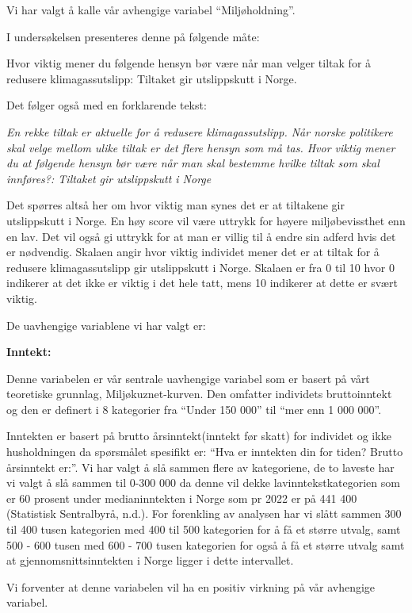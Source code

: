 \documentclass[
  12pt,
  letterpaper,
  DIV=11,
  numbers=noendperiod]{scrartcl}
\begin{document}
Vi har valgt å kalle vår avhengige variabel ``Miljøholdning''.

I undersøkelsen presenteres denne på følgende måte:

Hvor viktig mener du følgende hensyn bør være når man velger tiltak for
å redusere klimagassutslipp: Tiltaket gir utslippskutt i Norge.

Det følger også med en forklarende tekst:

\emph{En rekke tiltak er aktuelle for å redusere klimagassutslipp. Når
norske politikere skal velge mellom ulike tiltak er det flere hensyn som
må tas. Hvor viktig mener du at følgende hensyn bør være når man skal
bestemme hvilke tiltak som skal innføres?: Tiltaket gir utslippskutt i
Norge}

Det spørres altså her om hvor viktig man synes det er at tiltakene gir
utslippskutt i Norge. En høy score vil være uttrykk for høyere
miljøbevissthet enn en lav. Det vil også gi uttrykk for at man er villig
til å endre sin adferd hvis det er nødvendig. Skalaen angir hvor viktig
individet mener det er at tiltak for å redusere klimagassutslipp gir
utslippskutt i Norge. Skalaen er fra 0 til 10 hvor 0 indikerer at det
ikke er viktig i det hele tatt, mens 10 indikerer at dette er svært
viktig.

De uavhengige variablene vi har valgt er:

\textbf{Inntekt:}

Denne variabelen er vår sentrale uavhengige variabel som er basert på
vårt teoretiske grunnlag, Miljøkuznet-kurven. Den omfatter individets
bruttoinntekt og den er definert i 8 kategorier fra ``Under 150 000''
til ``mer enn 1 000 000''.

Inntekten er basert på brutto årsinntekt(inntekt før skatt) for
individet og ikke husholdningen da spørsmålet spesifikt er: ``Hva er
inntekten din for tiden? Brutto årsinntekt er:''. Vi har valgt å slå
sammen flere av kategoriene, de to laveste har vi valgt å slå sammen til
0-300 000 da denne vil dekke lavinntekstkategorien som er 60 prosent
under medianinntekten i Norge som pr 2022 er på 441 400 (Statistisk
Sentralbyrå, n.d.). For forenkling av analysen har vi slått sammen 300
til 400 tusen kategorien med 400 til 500 kategorien for å få et større
utvalg, samt 500 - 600 tusen med 600 - 700 tusen kategorien for også å
få et større utvalg samt at gjennomsnittsinntekten i Norge ligger i
dette intervallet.

Vi forventer at denne variabelen vil ha en positiv virkning på vår
avhengige variabel.
\end{document}
